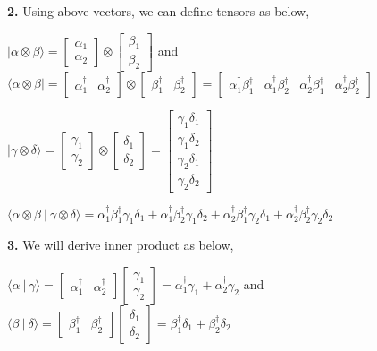 \documentclass [12pt]{article}
\theoremstyle{definition}
\newcommand{\ket}[1]{| {#1} \rangle}
\newcommand{\bra}[1]{\langle {#1} |}
\newcommand{\braket}[2]{\langle #1 \ | \ #2 \rangle}
\newcommand{\tensor}[2]{ #1 \otimes  #2 }
\begin{document}
\phantom{1em} {\bf 2.} Using above vectors, we can define tensors as below,

\phantom{1000em} $\ket{\tensor{\alpha}{\beta}} = \tensor{\begin{bmatrix} \alpha_{1} \\ \alpha_{2}\end{bmatrix}}{\begin{bmatrix} \beta_{1} \\ \beta_{2}\end{bmatrix}}$ and $\bra{\tensor{\alpha}{\beta}} = \tensor{\begin{bmatrix} \alpha^{\dag}_{1} & \alpha^{\dag}_{2}\end{bmatrix}}{\begin{bmatrix} \beta^{\dag}_{1} & \beta^{\dag}_{2}\end{bmatrix}} = \begin{bmatrix}\alpha^{\dag}_{1}\beta^{\dag}_{1} & \alpha^{\dag}_{1}\beta^{\dag}_{2} & \alpha^{\dag}_{2}\beta^{\dag}_{1} & \alpha^{\dag}_{2}\beta^{\dag}_{2}\end{bmatrix}$

\phantom{1000em} $\ket{\tensor{\gamma}{\delta}} = \tensor{\begin{bmatrix} \gamma_{1} \\ \gamma_{2}\end{bmatrix}}{\begin{bmatrix} \delta_{1} \\ \delta_{2}\end{bmatrix}} = \begin{bmatrix}\gamma_{1}\delta_{1} \\ \gamma_{1}\delta_{2} \\ \gamma_{2}\delta_{1} \\ \gamma_{2}\delta_{2}\end{bmatrix}$

\phantom{1000em} $\braket{\tensor{\alpha}{\beta}}{\tensor{\gamma}{\delta}} = \alpha^{\dag}_{1}\beta^{\dag}_{1}\gamma_{1}\delta_{1} + \alpha^{\dag}_{1}\beta^{\dag}_{2}\gamma_{1}\delta_{2} + \alpha^{\dag}_{2}\beta^{\dag}_{1}\gamma_{2}\delta_{1} + \alpha^{\dag}_{2}\beta^{\dag}_{2}\gamma_{2}\delta_{2}$

\phantom{1em} {\bf 3.} We will derive inner product as below,

\phantom{1000em} $\braket{\alpha}{\gamma} = \begin{bmatrix} \alpha^{\dag}_{1} & \alpha^{\dag}_{2}\end{bmatrix}\begin{bmatrix} \gamma_{1} \\ \gamma_{2}\end{bmatrix} = \alpha^{\dag}_{1}\gamma_{1} + \alpha^{\dag}_{2}\gamma_{2}$ and $\braket{\beta}{\delta} = \begin{bmatrix} \beta^{\dag}_{1} & \beta^{\dag}_{2}\end{bmatrix}\begin{bmatrix} \delta_{1} \\ \delta_{2}\end{bmatrix} = \beta^{\dag}_{1}\delta_{1} + \beta^{\dag}_{2}\delta_{2}$
\end{document}
